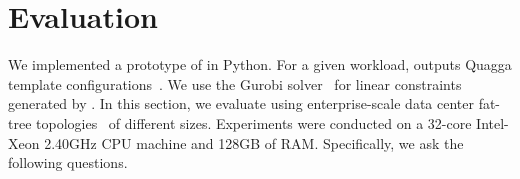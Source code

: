 \begin{figure}
	\begin{center}
	\end{center} 
\end{figure}
\section{Evaluation}
 \label{sec:evaluation}
 We implemented a prototype of \name in Python. 
 For a given workload, \name outputs Quagga template
 configurations~\cite{quagga}. 
 We use the Gurobi solver~\cite{gurobi} 
 for linear constraints generated by \name.
  In this section, we evaluate \Name using
enterprise-scale data
center fat-tree topologies~\cite{fattree} of different 
sizes. Experiments were conducted on a
32-core Intel-Xeon 2.40GHz CPU machine and
128GB of RAM.
Specifically, we ask the following questions.

